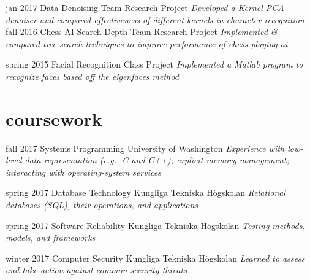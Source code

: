 \documentclass[]{friggeri-cv}
\begin{document}
\begin{entrylist}
  \entry
    {jan 2017}
    {Data Denoising}
    {Team Research Project}
    {\emph{Developed a Kernel PCA denoiser and compared effectiveness of different kernels in character recognition}}
  \entry
    {fall 2016}
    {Chess AI Search Depth}
    {Team Research Project}
    {\emph{Implemented \& compared tree search techniques to improve performance of chess playing ai}}

  \entry
    {spring 2015}
    {Facial Recognition}
    {Class Project}
    {\emph{Implemented a Matlab program to recognize faces based off the eigenfaces method}}
\end{entrylist}

\section{coursework}

\begin{entrylist}

  \entry
    {fall 2017}
    {Systems Programming}
    {University of Washington}
    {\emph{Experience with low-level data representation (e.g., C and C++); explicit memory management; interacting with operating-system services}}


  \entry
    {spring 2017}
    {Database Technology}
    {Kungliga Tekniska Högskolan}
    {\emph{Relational databases (SQL), their operations, and applications}}

  \entry
    {spring 2017}
    {Software Reliability}
    {Kungliga Tekniska Högskolan}
    {\emph{Testing methods, models, and frameworks}}

  \entry
    {winter 2017}
    {Computer Security}
    {Kungliga Tekniska Högskolan}
    {\emph{Learned to assess and take action against common security threats}}


\end{entrylist}
\end{document}
